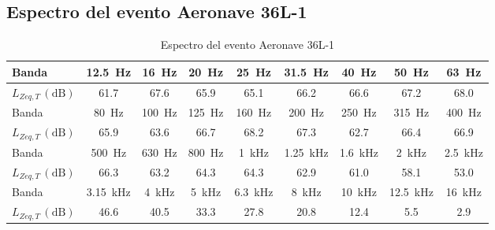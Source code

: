 \documentclass[11pt]{article}
\begin{document}
\subsection{Espectro del evento Aeronave 36L-1}
\begin{table}[htbp]
    \centering
    \caption{Espectro del evento Aeronave 36L-1}
    \begin{tabular}{|l||c|c|c|c|c|c|c|c|}
        \hline
        Banda                       & \qty{12.5}{\hertz}      & \qty{16}{\hertz}     & \qty{20}{\hertz}     & \qty{25}{\hertz}       & \qty{31.5}{\hertz}      & \qty{40}{\hertz}       & \qty{50}{\hertz}        & \qty{63}{\hertz}       \\ \hline
        $L_{Zeq,T} \, (\unit{\dB})$ & 61.7                    & 67.6                 & 65.9                 & 65.1                   & 66.2                    & 66.6                   & 67.2                    & 68.0                   \\ \hline \hline
        Banda                       & \qty{80}{\hertz}        & \qty{100}{\hertz}    & \qty{125}{\hertz}    & \qty{160}{\hertz}      & \qty{200}{\hertz}       & \qty{250}{\hertz}      & \qty{315}{\hertz}       & \qty{400}{\hertz}      \\ \hline
        $L_{Zeq,T} \, (\unit{\dB})$ & 65.9                    & 63.6                 & 66.7                 & 68.2                   & 67.3                    & 62.7                   & 66.4                    & 66.9                   \\ \hline \hline
        Banda                       & \qty{500}{\hertz}       & \qty{630}{\hertz}    & \qty{800}{\hertz}    & \qty{1}{\kilo\hertz}   & \qty{1.25}{\kilo\hertz} & \qty{1.6}{\kilo\hertz} & \qty{2}{\kilo\hertz}    & \qty{2.5}{\kilo\hertz} \\ \hline
        $L_{Zeq,T} \, (\unit{\dB})$ & 66.3                    & 63.2                 & 64.3                 & 64.3                   & 62.9                    & 61.0                   & 58.1                    & 53.0                   \\ \hline \hline
        Banda                       & \qty{3.15}{\kilo\hertz} & \qty{4}{\kilo\hertz} & \qty{5}{\kilo\hertz} & \qty{6.3}{\kilo\hertz} & \qty{8}{\kilo\hertz}    & \qty{10}{\kilo\hertz}  & \qty{12.5}{\kilo\hertz} & \qty{16}{\kilo\hertz}  \\ \hline
        $L_{Zeq,T} \, (\unit{\dB})$ & 46.6                    & 40.5                 & 33.3                 & 27.8                   & 20.8                    & 12.4                   & 5.5                     & 2.9                    \\ \hline \hline

\end{tabular}
\end{table}
\end{document}
